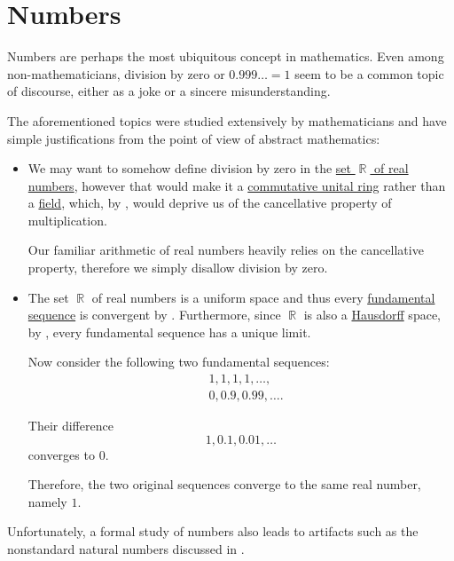 \section{Numbers}\label{sec:numbers}

Numbers are perhaps the most ubiquitous concept in mathematics. Even among non-mathematicians, division by zero or \( 0.999\ldots = 1 \) seem to be a common topic of discourse, either as a joke or a sincere misunderstanding.

The aforementioned topics were studied extensively by mathematicians and have simple justifications from the point of view of abstract mathematics:
\begin{itemize}
  \item We may want to somehow define division by zero in the \hyperref[def:set_of_real_numbers]{set \( \BbbR \) of real numbers}, however that would make it a \hyperref[def:semiring/commutative_unital_ring]{commutative unital ring} rather than a \hyperref[def:field]{field}, which, by , would deprive us of the cancellative property of multiplication.

  Our familiar arithmetic of real numbers heavily relies on the cancellative property, therefore we simply disallow division by zero.

  \item The set \( \BbbR \) of real numbers is a uniform space and thus every \hyperref[def:fundamental_net]{fundamental sequence} is convergent by . Furthermore, since \( \BbbR \) is also a \hyperref[def:separation_axioms/T2]{Hausdorff} space, by , every fundamental sequence has a unique limit.

  Now consider the following two fundamental sequences:
  \begin{align*}
    &1, 1, 1, 1, \ldots, \\
    &0, 0.9, 0.99, \ldots.
  \end{align*}

  Their difference
  \begin{equation*}
    1, 0.1, 0.01, \ldots
  \end{equation*}
  converges to \( 0 \).

  Therefore, the two original sequences converge to the same real number, namely \( 1 \).
\end{itemize}

Unfortunately, a formal study of numbers also leads to artifacts such as the nonstandard natural numbers discussed in .

